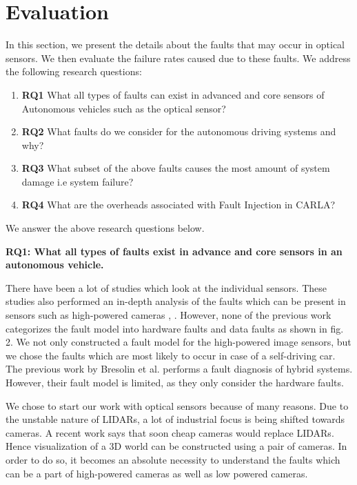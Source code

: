 \section{Evaluation}
In this section, we present the details about the faults that may occur in optical sensors. We then evaluate the failure rates caused due to these faults. We address the following research questions:
\begin{enumerate}
	\item \textbf{RQ1}
	What all types of faults can exist in advanced and core sensors of Autonomous vehicles such as the optical sensor?
	\item \textbf{RQ2}
	What faults do we consider for the autonomous driving systems and why?
	\item \textbf{RQ3}
	What subset of the above faults causes the most amount of system damage i.e system failure?
	\item \textbf{RQ4}
	What are the overheads associated with Fault Injection in CARLA?
\end{enumerate}
We answer the above research questions below. 

\vskip 0.1in
\textbf{RQ1: What all types of faults exist in advance and core sensors in an autonomous vehicle.}

There have been a lot of studies which look at the individual sensors. These studies also performed an in-depth analysis of the faults which can be present in sensors such as high-powered cameras \cite{5530865}, \cite{inproceedings}. However, none of the previous work categorizes the fault model into hardware faults and data faults as shown in fig. 2. We not only constructed a fault model for the high-powered image sensors, but we chose the faults which are most likely to occur in case of a self-driving car. The previous work by Bresolin et al. \cite{inproceedings} performs a fault diagnosis of hybrid systems. However, their fault model is limited, as they only consider the hardware faults. 

We chose to start our work with optical sensors because of many reasons. Due to the unstable nature of LIDARs, a lot of industrial focus is being shifted towards cameras. A recent work says that soon cheap cameras would replace LIDARs\cite{cheapcamera}. Hence visualization of a 3D world can be constructed using a pair of cameras. In order to do so, it becomes an absolute necessity to understand the faults which can be a part of high-powered cameras as well as low powered cameras. 

